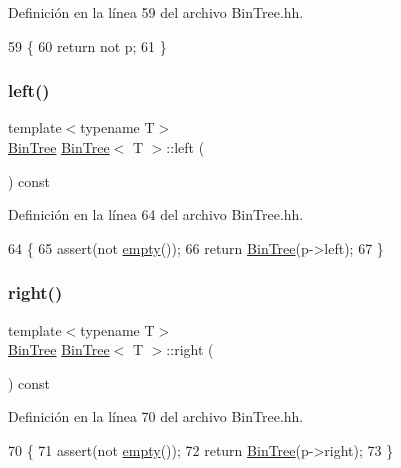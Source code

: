 Definición en la línea 59 del archivo Bin\+Tree.\+hh.


\begin{DoxyCode}
59                         \{
60         \textcolor{keywordflow}{return} not p;
61     \}
\end{DoxyCode}
\mbox{\label{class_bin_tree_a82108db4c1b08d1f111027788c196d4e}} 
\subsubsection{\texorpdfstring{left()}{left()}}
{\footnotesize\ttfamily template$<$typename T$>$ \\
\mbox{\hyperlink{class_bin_tree}{Bin\+Tree}} \mbox{\hyperlink{class_bin_tree}{Bin\+Tree}}$<$ T $>$\+::left (\begin{DoxyParamCaption}{ }\end{DoxyParamCaption}) const}



Definición en la línea 64 del archivo Bin\+Tree.\+hh.


\begin{DoxyCode}
64                           \{
65         assert(not \mbox{\hyperlink{class_bin_tree_a74cda259ba5c25b8ee38ed4dc33e4fad}{empty}}());
66         \textcolor{keywordflow}{return} \mbox{\hyperlink{class_bin_tree_a47eef22d29cd023449d97c073c08e5b6}{BinTree}}(p->left);
67     \}
\end{DoxyCode}
\mbox{\label{class_bin_tree_aff8e96651b27284c329667b5ad3e4d0b}} 
\subsubsection{\texorpdfstring{right()}{right()}}
{\footnotesize\ttfamily template$<$typename T$>$ \\
\mbox{\hyperlink{class_bin_tree}{Bin\+Tree}} \mbox{\hyperlink{class_bin_tree}{Bin\+Tree}}$<$ T $>$\+::right (\begin{DoxyParamCaption}{ }\end{DoxyParamCaption}) const}



Definición en la línea 70 del archivo Bin\+Tree.\+hh.


\begin{DoxyCode}
70                            \{
71         assert(not \mbox{\hyperlink{class_bin_tree_a74cda259ba5c25b8ee38ed4dc33e4fad}{empty}}());
72         \textcolor{keywordflow}{return} \mbox{\hyperlink{class_bin_tree_a47eef22d29cd023449d97c073c08e5b6}{BinTree}}(p->right);
73     \}
\end{DoxyCode}
\mbox{\label{class_bin_tree_a734e785b089c87b49187ee7c58edf5f3}} 
